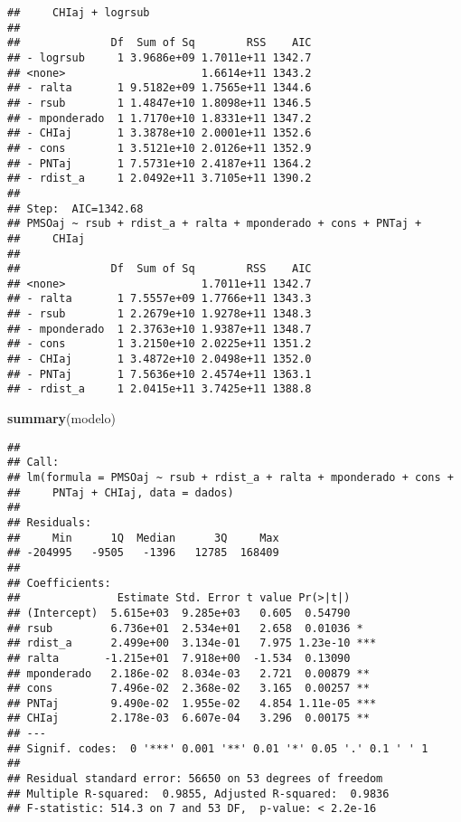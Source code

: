 \documentclass[
]{article}
\newenvironment{Shaded}{\begin{snugshade}}{\end{snugshade}}
\newcommand{\KeywordTok}[1]{\textcolor[rgb]{0.13,0.29,0.53}{\textbf{#1}}}
\newcommand{\NormalTok}[1]{#1}
\begin{document}
\begin{verbatim}
##     CHIaj + logrsub
## 
##              Df  Sum of Sq        RSS    AIC
## - logrsub     1 3.9686e+09 1.7011e+11 1342.7
## <none>                     1.6614e+11 1343.2
## - ralta       1 9.5182e+09 1.7565e+11 1344.6
## - rsub        1 1.4847e+10 1.8098e+11 1346.5
## - mponderado  1 1.7170e+10 1.8331e+11 1347.2
## - CHIaj       1 3.3878e+10 2.0001e+11 1352.6
## - cons        1 3.5121e+10 2.0126e+11 1352.9
## - PNTaj       1 7.5731e+10 2.4187e+11 1364.2
## - rdist_a     1 2.0492e+11 3.7105e+11 1390.2
## 
## Step:  AIC=1342.68
## PMSOaj ~ rsub + rdist_a + ralta + mponderado + cons + PNTaj + 
##     CHIaj
## 
##              Df  Sum of Sq        RSS    AIC
## <none>                     1.7011e+11 1342.7
## - ralta       1 7.5557e+09 1.7766e+11 1343.3
## - rsub        1 2.2679e+10 1.9278e+11 1348.3
## - mponderado  1 2.3763e+10 1.9387e+11 1348.7
## - cons        1 3.2150e+10 2.0225e+11 1351.2
## - CHIaj       1 3.4872e+10 2.0498e+11 1352.0
## - PNTaj       1 7.5636e+10 2.4574e+11 1363.1
## - rdist_a     1 2.0415e+11 3.7425e+11 1388.8
\end{verbatim}

\begin{Shaded}
\begin{Highlighting}[]
\KeywordTok{summary}\NormalTok{(modelo)}
\end{Highlighting}
\end{Shaded}

\begin{verbatim}
## 
## Call:
## lm(formula = PMSOaj ~ rsub + rdist_a + ralta + mponderado + cons + 
##     PNTaj + CHIaj, data = dados)
## 
## Residuals:
##     Min      1Q  Median      3Q     Max 
## -204995   -9505   -1396   12785  168409 
## 
## Coefficients:
##               Estimate Std. Error t value Pr(>|t|)    
## (Intercept)  5.615e+03  9.285e+03   0.605  0.54790    
## rsub         6.736e+01  2.534e+01   2.658  0.01036 *  
## rdist_a      2.499e+00  3.134e-01   7.975 1.23e-10 ***
## ralta       -1.215e+01  7.918e+00  -1.534  0.13090    
## mponderado   2.186e-02  8.034e-03   2.721  0.00879 ** 
## cons         7.496e-02  2.368e-02   3.165  0.00257 ** 
## PNTaj        9.490e-02  1.955e-02   4.854 1.11e-05 ***
## CHIaj        2.178e-03  6.607e-04   3.296  0.00175 ** 
## ---
## Signif. codes:  0 '***' 0.001 '**' 0.01 '*' 0.05 '.' 0.1 ' ' 1
## 
## Residual standard error: 56650 on 53 degrees of freedom
## Multiple R-squared:  0.9855, Adjusted R-squared:  0.9836 
## F-statistic: 514.3 on 7 and 53 DF,  p-value: < 2.2e-16
\end{verbatim}
\end{document}
